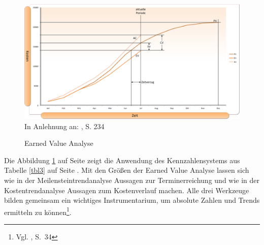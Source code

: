 \begin{figure}[htbp]
\begin{center}
\includegraphics[width=1\textwidth]{Images/eva.png}\\{\footnotesize In Anlehnung an: \cite{Drews&Hillebrand2007}, S. 234}
\caption[Earned Value Analyse]{Earned Value Analyse}\label{abb11}
\end{center}
\end{figure}

Die Abbildung \ref{abb11} auf Seite \pageref{abb11} zeigt die Anwendung des Kennzahlensystems aus Tabelle \ref{tbl3} auf Seite \pageref{tbl3}. Mit den Größen der Earned Value Analyse lassen sich wie in der Meilensteintrendanalyse Aussagen zur Terminerreichung und wie in der Kostentrendanalyse Aussagen zum Kostenverlauf machen. Alle drei Werkzeuge bilden gemeinsam ein wichtiges Instrumentarium, um absolute Zahlen und Trends ermitteln zu können\footnote{Vgl. \cite{Gubbels2006}, S.~34}. 
